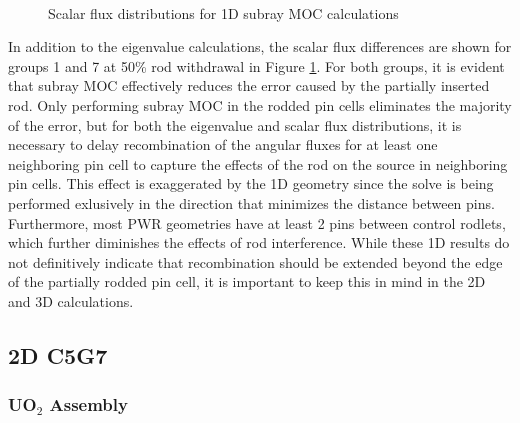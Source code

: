 \begin{figure}[h]
    \centering
    ~
    \caption{Scalar flux distributions for 1D subray MOC calculations}\label{f:1d-subray-scalflux}
\end{figure}

In addition to the eigenvalue calculations, the scalar flux differences are shown for groups 1 and 7 at 50\% rod withdrawal in Figure \ref{f:1d-subray-scalflux}.  For both groups, it is evident that subray MOC effectively reduces the error caused by the partially inserted rod.  Only performing subray MOC in the rodded pin cells eliminates the majority of the error, but for both the eigenvalue and scalar flux distributions, it is necessary to delay recombination of the angular fluxes for at least one neighboring pin cell to capture the effects of the rod on the source in neighboring pin cells.  This effect is exaggerated by the 1D geometry since the solve is being performed exlusively in the direction that minimizes the distance between pins.  Furthermore, most PWR geometries have at least 2 pins between control rodlets, which further diminishes the effects of rod interference.  While these 1D results do not definitively indicate that recombination should be extended beyond the edge of the partially rodded pin cell, it is important to keep this in mind in the 2D and 3D calculations.

\subsection{2D C5G7}

\subsubsection{UO\texorpdfstring{$_2$}{2} Assembly}

